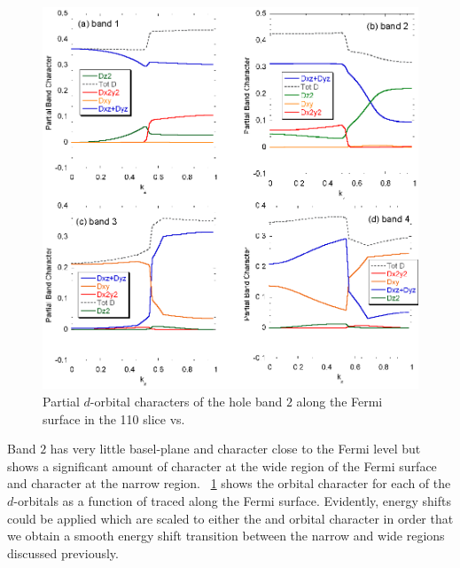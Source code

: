 \begin{figure}[htbp]
    \begin{center}
        \includegraphics[scale=0.9]{Chapter3-dHvABaFe2P2/Figures/AngleDepMeasurements/BandCharacterVsKz/BandCharacterVsKz}
        \caption{Partial $d$-orbital characters of the hole band $2$ along the Fermi surface in the 110 slice vs. \kz}
        \label{Fig:3:Band2DCharacterVsKz}
    \end{center}
\end{figure}

Band $2$ has very little basel-plane \Dxy and \DxTwoyTwo character close to the Fermi level but shows a significant amount of \DzTwo character at the wide region of the Fermi surface and \DxzDyz character at the narrow region. \Fig~\ref{Fig:3:Band2DCharacterVsKz} shows the orbital character for each of the $d$-orbitals as a function of \kz traced along the Fermi surface. Evidently, energy shifts could be applied which are scaled to either the \DzTwo and \DxzDyz orbital character in order that we obtain a smooth energy shift transition between the narrow and wide regions discussed previously. 


